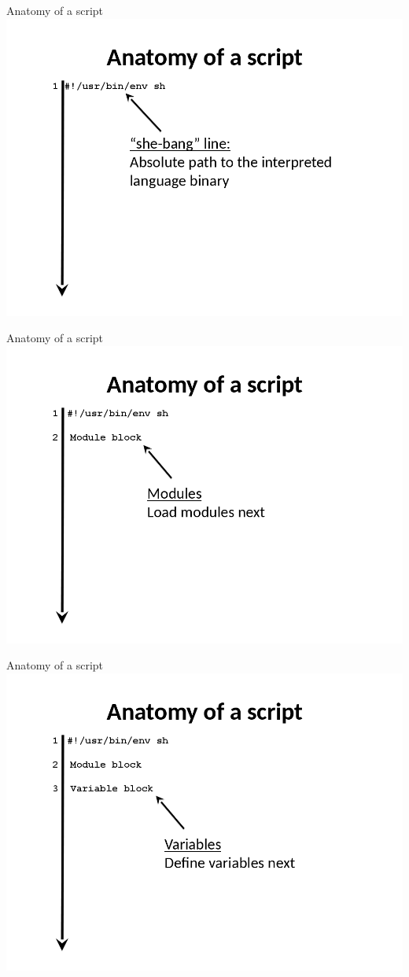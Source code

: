 \documentclass[t,10pt]{beamer}
\begin{document}
\begin{frame}[label={sec:orgheadline7}]{Anatomy of a script}
\includegraphics[width=.9\linewidth]{figures/2_anatomy_shell_script.png}
\end{frame}
\begin{frame}[label={sec:orgheadline8}]{Anatomy of a script}
\includegraphics[width=.9\linewidth]{figures/3_anatomy_shell_script.png}
\end{frame}
\begin{frame}[label={sec:orgheadline9}]{Anatomy of a script}
\includegraphics[width=.9\linewidth]{figures/4_anatomy_shell_script.png}
\end{frame}
\end{document}
